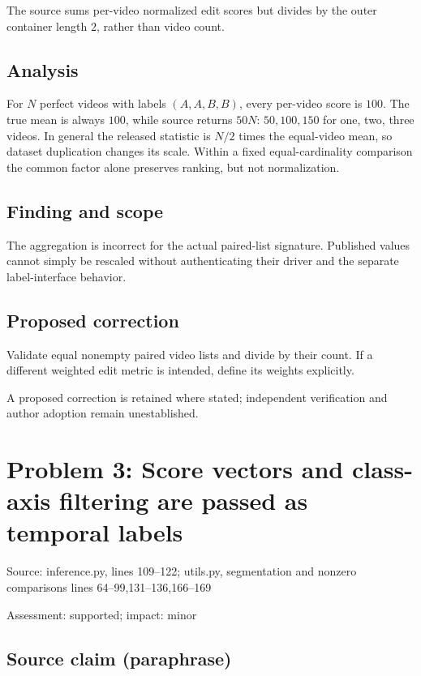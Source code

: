 \documentclass[11pt]{article}
\begin{document}
The source sums per-video normalized edit scores but divides by the outer container length \(2\), rather than video count.

\subsection*{Analysis}

For \(N\) perfect videos with labels \((A,A,B,B)\), every per-video score is \(100\). The true mean is always \(100\), while source returns \(50N\): \(50,100,150\) for one, two, three videos. In general the released statistic is \(N/2\) times the equal-video mean, so dataset duplication changes its scale. Within a fixed equal-cardinality comparison the common factor alone preserves ranking, but not normalization.

\subsection*{Finding and scope}

The aggregation is incorrect for the actual paired-list signature. Published values cannot simply be rescaled without authenticating their driver and the separate label-interface behavior.

\subsection*{Proposed correction}

Validate equal nonempty paired video lists and divide by their count. If a different weighted edit metric is intended, define its weights explicitly.

A proposed correction is retained where stated; independent verification and author adoption remain unestablished.

\section*{Problem 3: Score vectors and class-axis filtering are passed as temporal labels}

Source: inference.py, lines 109–122; utils.py, segmentation and nonzero comparisons lines 64–99,131–136,166–169

Assessment: supported; impact: minor

\subsection*{Source claim (paraphrase)}
\end{document}
